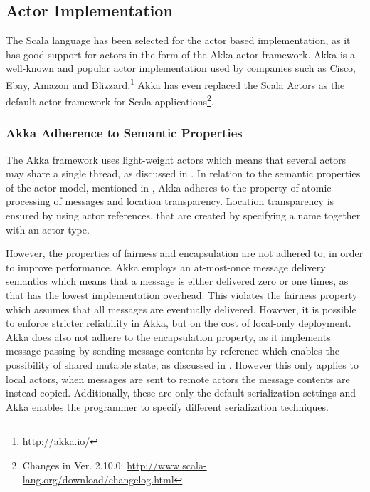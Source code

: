 \subsection{Actor Implementation}
The Scala language has been selected for the actor based implementation, as it has good support for actors in the form of the Akka actor framework. Akka is a well-known and popular actor implementation used by companies such as Cisco, Ebay, Amazon and Blizzard.\footnote{\url{http://akka.io/}} Akka has even replaced the Scala Actors as the default actor framework for Scala applications\footnote{Changes in Ver. 2.10.0: \url{http://www.scala-lang.org/download/changelog.html}}.

\subsubsection{Akka Adherence to Semantic Properties}
The Akka framework uses light-weight actors which means that several actors may share a single thread\cite[p. 13]{akkaDoc}, as discussed in . 
In relation to the semantic properties of the actor model, mentioned in , Akka adheres to the property of atomic processing of messages and location transparency. Location transparency is ensured by using actor references, that are created by specifying a name together with an actor type\cite[p. 24]{akkaDoc}. 

However, the properties of fairness and encapsulation are not adhered to, in order to improve performance. Akka employs an at-most-once message delivery semantics which means that a message is either delivered zero or one times, as that has the lowest implementation overhead\cite[p. 27]{akkaDoc}. This violates the fairness property which assumes that all messages are eventually delivered. However, it is possible to enforce stricter reliability in Akka, but on the cost of local-only deployment\cite[p. 29]{akkaDoc}. Akka does also not adhere to the encapsulation property, as it implements message passing by sending message contents by reference which enables the possibility of shared mutable state, as discussed in . However this only applies to local actors, when messages are sent to remote actors the message contents are instead copied. Additionally, these are only the default serialization settings and Akka enables the programmer to specify different serialization techniques\cite[p. 219]{akkaDoc}.

